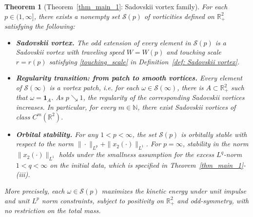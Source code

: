 \documentclass[11pt]{amsart}
\newtheorem{theorem}{Theorem}[section]
\theoremstyle{definition}
\theoremstyle{definition}
\numberwithin{equation}{section}
\newcommand{\0}{\emptyset}
\newcommand{\omg}{\omega}
\newcommand{\bbR}{\mathbb R}
\begin{document}
	
	\begin{theorem}[Theorem~\ref{thm_main_1}: Sadovskii vortex family]\label{thm_intro_main}
		For each $p \in (1,\infty]$, there exists a nonempty set $\mathcal{S}(p)$ of vorticities defined on $\bbR^2_+$ satisfying the following:
		\begin{itemize}[itemsep=0.8em, topsep=0.8em]
			
			\item[(i)] \textbf{Sadovskii vortex.}  	 The odd extension of every element in $\mathcal{S}(p)$ is a Sadovskii vortex with traveling speed $W=W(p)$ and touching scale $r=r(p)$ satisfying \eqref{touching_scale} in Definition~\ref{def: Sadovskii vortex}.

			
			
			\item[(ii)] \textbf{Regularity transition: from patch to smooth vortices.}  
			Every element of $\mathcal{S}(\infty)$ is a vortex patch, i.e. for each $\omg \in \mathcal{S}(\infty)$, there is $A \subset \mathbb{R}^{2}_{+}$ such that $\omg = \mathbf{1}_{A}$.
			As $p \searrow 1$, the regularity of the corresponding Sadovskii vortices increases. In particular, for every $m \in \mathbb{N}$, there exist Sadovskii vortices of class $C^m(\mathbb{R}^2)$.

			
			\item[(iii)] \textbf{{Orbital} stability.}  
			For any $1 < p < \infty$, the set $\mathcal{S}(p)$ is {orbitally} stable with respect to the norm  $\|\cdot\|_{L^p} + \|x_2(\cdot)\|_{L^1}$.
            {
            For $p = \infty$, stability in the norm $\|x_2(\cdot)\|_{L^1}$ holds under the smallness assumption for the excess $L^q$-norm $1 < q < \infty$ on the initial data, which is specified in Theorem~\ref{thm_main_1}-(iii).
            }
		\end{itemize}
		More precisely, each $\omega \in \mathcal{S}(p)$ maximizes the kinetic energy under unit impulse and unit $L^p$ norm constraints, subject to positivity on $\bbR^2_+$ and odd-symmetry, with no restriction on the total mass.
	\end{theorem}
	
\end{document}
